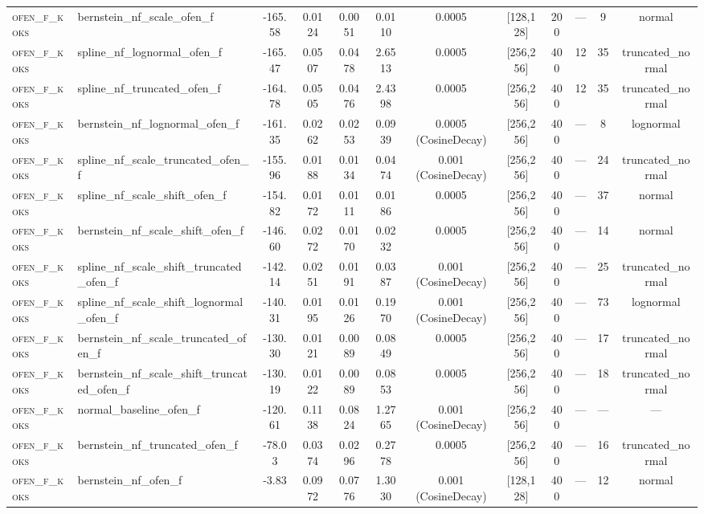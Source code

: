 \begin{table}[htbp]
\begin{tabular}{llS[table-format=-4.2]S[table-format=-4.2]S[table-format=-1.4]S[table-format=-1.4]cccccc}
\textsc{ofen\_f\_koks} & bernstein_nf_scale_ofen_f & -165.58 & 0.0124 & 0.0051 & 0.0110 & 0.0005 & [128,128] & 200 & — & 9 & normal \\
\textsc{ofen\_f\_koks} & spline_nf_lognormal_ofen_f & -165.47 & 0.0507 & 0.0478 & 2.6513 & 0.0005 & [256,256] & 400 & 12 & 35 & truncated_normal \\
\textsc{ofen\_f\_koks} & spline_nf_truncated_ofen_f & -164.78 & 0.0505 & 0.0476 & 2.4398 & 0.0005 & [256,256] & 400 & 12 & 35 & truncated_normal \\
\textsc{ofen\_f\_koks} & bernstein_nf_lognormal_ofen_f & -161.35 & 0.0262 & 0.0253 & 0.0939 & 0.0005 (CosineDecay) & [256,256] & 400 & — & 8 & lognormal \\
\textsc{ofen\_f\_koks} & spline_nf_scale_truncated_ofen_f & -155.96 & 0.0188 & 0.0134 & 0.0474 & 0.001 (CosineDecay) & [256,256] & 400 & — & 24 & truncated_normal \\
\textsc{ofen\_f\_koks} & spline_nf_scale_shift_ofen_f & -154.82 & 0.0172 & 0.0111 & 0.0186 & 0.0005 & [256,256] & 400 & — & 37 & normal \\
\textsc{ofen\_f\_koks} & bernstein_nf_scale_shift_ofen_f & -146.60 & 0.0272 & 0.0170 & 0.0232 & 0.0005 & [256,256] & 400 & — & 14 & normal \\
\textsc{ofen\_f\_koks} & spline_nf_scale_shift_truncated_ofen_f & -142.14 & 0.0251 & 0.0191 & 0.0387 & 0.001 (CosineDecay) & [256,256] & 400 & — & 25 & truncated_normal \\
\textsc{ofen\_f\_koks} & spline_nf_scale_shift_lognormal_ofen_f & -140.31 & 0.0195 & 0.0126 & 0.1970 & 0.001 (CosineDecay) & [256,256] & 400 & — & 73 & lognormal \\
\textsc{ofen\_f\_koks} & bernstein_nf_scale_truncated_ofen_f & -130.30 & 0.0121 & 0.0089 & 0.0849 & 0.0005 & [256,256] & 400 & — & 17 & truncated_normal \\
\textsc{ofen\_f\_koks} & bernstein_nf_scale_shift_truncated_ofen_f & -130.19 & 0.0122 & 0.0089 & 0.0853 & 0.0005 & [256,256] & 400 & — & 18 & truncated_normal \\
\textsc{ofen\_f\_koks} & normal_baseline_ofen_f & -120.61 & 0.1138 & 0.0824 & 1.2765 & 0.001 (CosineDecay) & [256,256] & 400 & — & — & — \\
\textsc{ofen\_f\_koks} & bernstein_nf_truncated_ofen_f & -78.03 & 0.0374 & 0.0296 & 0.2778 & 0.0005 & [256,256] & 400 & — & 16 & truncated_normal \\
\textsc{ofen\_f\_koks} & bernstein_nf_ofen_f & -3.83 & 0.0972 & 0.0776 & 1.3030 & 0.001 (CosineDecay) & [128,128] & 400 & — & 12 & normal \\

\end{tabular}
\end{table}

